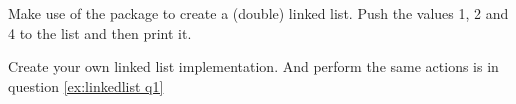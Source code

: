 \begin{Exercise}[title={Linked List},difficulty=6]
\label{ex:linkedlist}
\Question
\label{ex:linkedlist q1}
Make use of the package  to create
a (double) linked list. Push the values 1, 2 and 4 to the list and then
print it.

\Question
Create your own linked list implementation. And perform the same actions
is in question \ref{ex:linkedlist q1}
\end{Exercise}

\begin{Answer}
\Question

\Question
\end{Answer}
